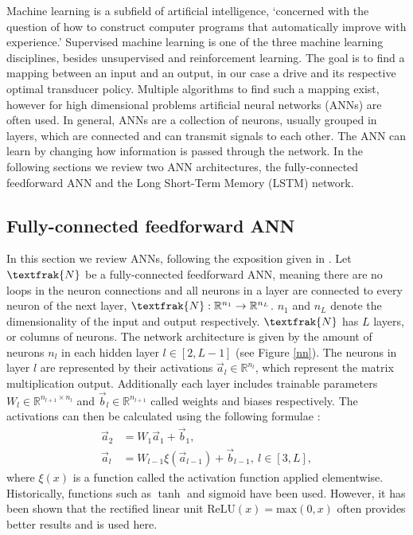 Machine learning is a subfield of artificial intelligence, `concerned with the question of how to construct computer programs that automatically improve with experience.' \cite{Mitchell97}
Supervised machine learning is one of the three machine learning disciplines, besides unsupervised and reinforcement learning.
The goal is to find a mapping between an input and an output, in our case a drive and its respective optimal transducer policy.
Multiple algorithms to find such a mapping exist, however for high dimensional problems artificial neural networks (ANNs) are often used.
In general, ANNs are a collection of neurons, usually grouped in layers, which are connected and can transmit signals to each other.
The ANN can learn by changing how information is passed through the network.
In the following sections we review two ANN architectures, the fully-connected feedforward ANN and the Long Short-Term Memory (LSTM) network.

\subsection{Fully-connected feedforward ANN}
In this section we review ANNs, following the exposition given in \cite{lu2020dying}.
Let $\textfrak{N}$ be a fully-connected feedforward ANN, meaning there are no loops in the neuron connections and all neurons in a layer are connected to every neuron of the next layer, $\textfrak{N}: \mathbb{R}^{n_1} \to \mathbb{R}^{n_L}$. $n_1$ and $n_L$ denote the dimensionality of the input and output respectively. 
$\textfrak{N}$ has $L$ layers, or columns of neurons.
The network architecture is given by the amount of neurons $n_l$ in each hidden layer $l \in [2, L - 1]$ (see Figure \ref{nn}).
The neurons in layer $l$ are represented by their activations $\vec{a}_l \in \mathbb{R}^{n_l}$, which represent the matrix multiplication output. Additionally each layer includes trainable parameters $W_l \in \mathbb{R}^{n_{l+1} \times n_{l}}$ and $\vec{b}_l \in \mathbb{R}^{n_{l+1}}$ called weights and biases respectively.
The activations can then be calculated using the following formulae \cite{TN_libero_mab2)53517}:
\begin{align*}
	\vec{a}_2 & = W_1 \vec{a}_1 + \vec{b}_1, \\
	\vec{a}_l & = W_{l-1} \xi(\vec{a}_{l-1}) + \vec{b}_{l-1}, \ l \in [3, L],
\end{align*}
where $\xi(x)$ is a function called the activation function applied elementwise. Historically, functions such as $\tanh$ and sigmoid have been used. However, it has been shown \cite{Maas2013RectifierNI, krizhevsky} that the rectified linear unit $\mathrm{ReLU}(x) = \mathrm{max}(0, x)$ often provides better results and is used here.

